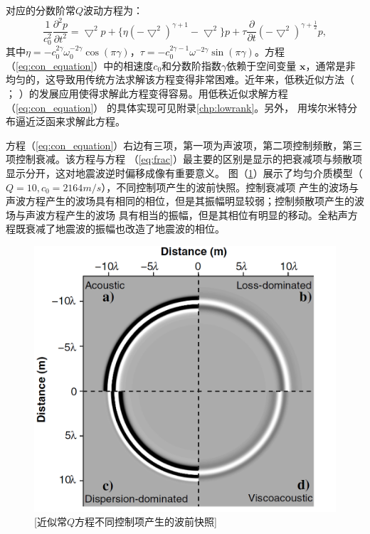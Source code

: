 对应的分数阶常$Q$波动方程为：
\begin{equation}
	\frac{1}{c_0^2}\frac{\partial^2p}{\partial t^2}=\bigtriangledown^2p + \{\eta(-\bigtriangledown^2)^
	{\gamma+1}-\bigtriangledown^2\}p + \tau\frac{\partial}{\partial t}(-\bigtriangledown^2)^{\gamma+
	\frac{1}{2}}p,
	\label{eq:con_equation}
\end{equation}
其中$\eta=-c_0^{2\gamma}\omega_0^{-2\gamma}\cos(\pi\gamma)$，$\tau=-c_0^{2\gamma-1}\omega^{-2\gamma}
\sin(\pi\gamma)$。方程（\ref{eq:con_equation}）中的相速度$c_0$和分数阶指数$\gamma$依赖于空间变量
$\mathbf{x}$，通常是非均匀的，这导致用传统方法求解该方程变得非常困难。近年来，低秩近似方法（ 
； ）的发展应用使得求解此方程变得容易。用低秩近似求解方程（\ref{eq:con_equation}）
的具体实现可见附录\ref{chp:lowrank}。另外， 用埃尔米特分布逼近泛函来求解此方程。


方程（\ref{eq:con_equation}）右边有三项，第一项为声波项，第二项控制频散，第三项控制衰减。该方程与方程
（\ref{eq:frac}）最主要的区别是显示的把衰减项与频散项显示分开，这对地震波逆时偏移成像有重要意义。
图（\ref{fig:wave_frac}）展示了均匀介质模型（$Q=10,c_0=2164m/s$），不同控制项产生的波前快照。控制衰减项
产生的波场与声波方程产生的波场具有相同的相位，但是其振幅明显较弱；控制频散项产生的波场与声波方程产生的波场
具有相当的振幅，但是其相位有明显的移动。全粘声方程既衰减了地震波的振幅也改造了地震波的相位。
\begin{figure}[!htbp]
	    \centering
		\includegraphics[width=0.7\linewidth]{figure/wave_frac}
		[近似常$Q$方程不同控制项产生的波前快照]
		\label{fig:wave_frac}
\end{figure}


